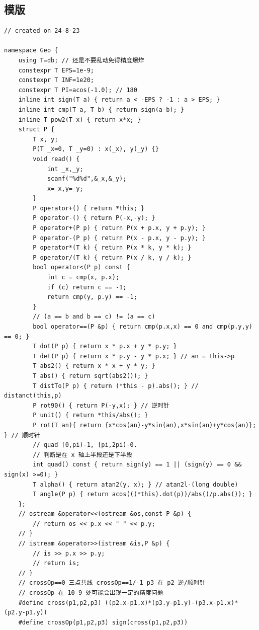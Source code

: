 \documentclass[a4paper,12pt]{article}
\begin{document}
\subsection{模版}

\begin{lstlisting}
// created on 24-8-23

namespace Geo {
    using T=db; // 还是不要乱动免得精度爆炸
    constexpr T EPS=1e-9;
    constexpr T INF=1e20;
    constexpr T PI=acos(-1.0); // 180
    inline int sign(T a) { return a < -EPS ? -1 : a > EPS; }
    inline int cmp(T a, T b) { return sign(a-b); }
    inline T pow2(T x) { return x*x; }
    struct P {
        T x, y;
        P(T _x=0, T _y=0) : x(_x), y(_y) {}
        void read() {
            int _x,_y;
            scanf("%d%d",&_x,&_y);
            x=_x,y=_y;
        }
        P operator+() { return *this; }
        P operator-() { return P(-x,-y); }
        P operator+(P p) { return P(x + p.x, y + p.y); }
        P operator-(P p) { return P(x - p.x, y - p.y); }
        P operator*(T k) { return P(x * k, y * k); }
        P operator/(T k) { return P(x / k, y / k); }
        bool operator<(P p) const {
            int c = cmp(x, p.x);
            if (c) return c == -1;
            return cmp(y, p.y) == -1;
        }
        // (a == b and b == c) != (a == c)
        bool operator==(P &p) { return cmp(p.x,x) == 0 and cmp(p.y,y) == 0; }
        T dot(P p) { return x * p.x + y * p.y; }
        T det(P p) { return x * p.y - y * p.x; } // an = this->p
        T abs2() { return x * x + y * y; }
        T abs() { return sqrt(abs2()); }
        T distTo(P p) { return (*this - p).abs(); } // distanct(this,p)
        P rot90() { return P(-y,x); } // 逆时针
        P unit() { return *this/abs(); }
        P rot(T an){ return {x*cos(an)-y*sin(an),x*sin(an)+y*cos(an)}; } // 顺时针
        // quad [0,pi)-1, [pi,2pi)-0.
        // 判断是在 x 轴上半段还是下半段
        int quad() const { return sign(y) == 1 || (sign(y) == 0 && sign(x) >=0); }
        T alpha() { return atan2(y, x); } // atan2l-(long double)
        T angle(P p) { return acos(((*this).dot(p))/abs()/p.abs()); }
    };
    // ostream &operator<<(ostream &os,const P &p) {
        // return os << p.x << " " << p.y;
    // }
    // istream &operator>>(istream &is,P &p) {
        // is >> p.x >> p.y;
        // return is;
    // }
    // crossOp==0 三点共线 crossOp==1/-1 p3 在 p2 逆/顺时针
    // crossOp 在 10-9 处可能会出现一定的精度问题
    #define cross(p1,p2,p3) ((p2.x-p1.x)*(p3.y-p1.y)-(p3.x-p1.x)*(p2.y-p1.y))
    #define crossOp(p1,p2,p3) sign(cross(p1,p2,p3))

\end{lstlisting}
\end{document}
